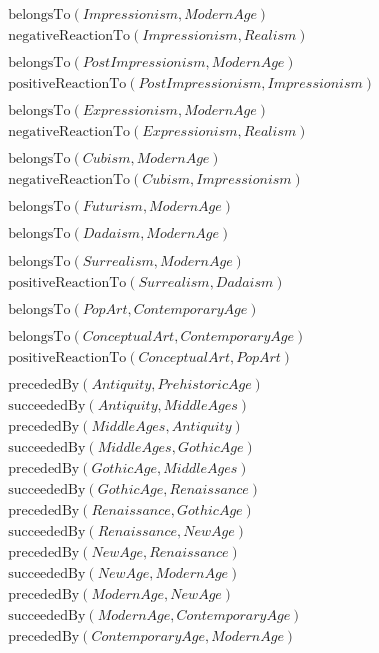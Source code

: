 \documentclass{article}
\begin{document}
\begin{align*}
  &\text{belongsTo}(Impressionism, ModernAge) \\
  &\text{negativeReactionTo}(Impressionism, Realism)\\\\
  &\text{belongsTo}(PostImpressionism, ModernAge) \\
  &\text{positiveReactionTo}(PostImpressionism, Impressionism)\\\\
  &\text{belongsTo}(Expressionism, ModernAge) \\
  &\text{negativeReactionTo}(Expressionism, Realism)\\\\
  &\text{belongsTo}(Cubism, ModernAge) \\
  &\text{negativeReactionTo}(Cubism, Impressionism)\\\\
  &\text{belongsTo}(Futurism, ModernAge)\\\\
  &\text{belongsTo}(Dadaism, ModernAge)\\\\
  &\text{belongsTo}(Surrealism, ModernAge) \\
  &\text{positiveReactionTo}(Surrealism, Dadaism)\\\\
  &\text{belongsTo}(PopArt, ContemporaryAge) \\\\
  &\text{belongsTo}(ConceptualArt, ContemporaryAge) \\
  &\text{positiveReactionTo}(ConceptualArt, PopArt) \\\\
  &\text{precededBy}(Antiquity, PrehistoricAge) \\
  &\text{succeededBy}(Antiquity, MiddleAges) \\
  &\text{precededBy}(MiddleAges, Antiquity) \\
  &\text{succeededBy}(MiddleAges, GothicAge) \\
  &\text{precededBy}(GothicAge, MiddleAges) \\
  &\text{succeededBy}(GothicAge, Renaissance) \\
  &\text{precededBy}(Renaissance, GothicAge) \\
  &\text{succeededBy}(Renaissance, NewAge) \\
  &\text{precededBy}(NewAge, Renaissance) \\
  &\text{succeededBy}(NewAge, ModernAge) \\
  &\text{precededBy}(ModernAge, NewAge) \\
  &\text{succeededBy}(ModernAge, ContemporaryAge) \\
  &\text{precededBy}(ContemporaryAge, ModernAge)
\end{align*}
\end{document}
